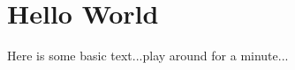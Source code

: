 \documentclass[]{article}
\begin{document}
\begin{abstract}

\end{abstract}

\section{Hello World}

Here is some basic text...play around for a minute...
\end{document}

